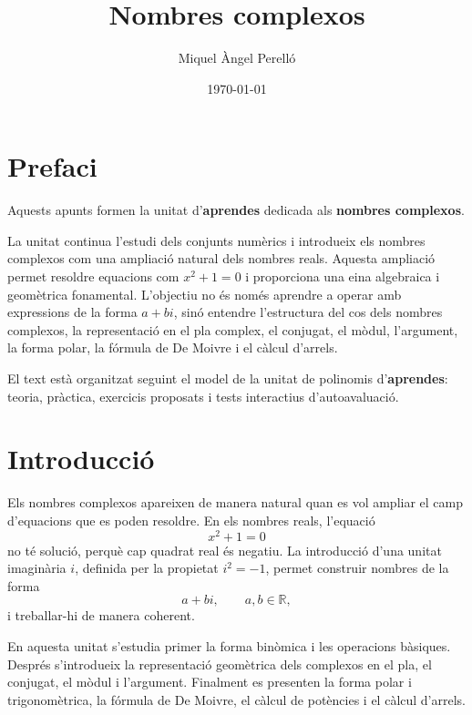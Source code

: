 \documentclass[12pt,a4paper,oneside]{book}
\begin{document}
\pagecolor{fons!20}

\frontmatter
\title{Nombres complexos}
\author{Miquel Àngel Perelló}
\date{\today}
\maketitle
\tableofcontents

\let\cleardoublepage\clearpage
\chapter*{Prefaci}
Aquests apunts formen la unitat d'\textbf{aprendes} dedicada als \textbf{nombres complexos}.

La unitat continua l'estudi dels conjunts numèrics i introdueix els nombres complexos com una ampliació natural dels nombres reals. Aquesta ampliació permet resoldre equacions com $x^2+1=0$ i proporciona una eina algebraica i geomètrica fonamental. L'objectiu no és només aprendre a operar amb expressions de la forma $a+bi$, sinó entendre l'estructura del cos dels nombres complexos, la representació en el pla complex, el conjugat, el mòdul, l'argument, la forma polar, la fórmula de De Moivre i el càlcul d'arrels.

El text està organitzat seguint el model de la unitat de polinomis d'\textbf{aprendes}: teoria, pràctica, exercicis proposats i tests interactius d'autoavaluació.

\chapter{Introducció}
Els nombres complexos apareixen de manera natural quan es vol ampliar el camp d'equacions que es poden resoldre. En els nombres reals, l'equació
\[
x^2+1=0
\]
no té solució, perquè cap quadrat real és negatiu. La introducció d'una unitat imaginària $i$, definida per la propietat $i^2=-1$, permet construir nombres de la forma
\[
a+bi, \qquad a,b\in\mathbb{R},
\]
i treballar-hi de manera coherent.

En aquesta unitat s'estudia primer la forma binòmica i les operacions bàsiques. Després s'introdueix la representació geomètrica dels complexos en el pla, el conjugat, el mòdul i l'argument. Finalment es presenten la forma polar i trigonomètrica, la fórmula de De Moivre, el càlcul de potències i el càlcul d'arrels.
\end{document}
